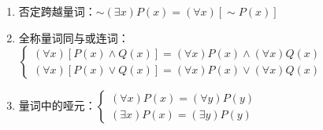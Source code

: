 \begin{solution}
\begin{enumerate}
		\item 否定跨越量词：$\sim (\exists x) P(x) = (\forall x)[\sim P(x)]$
		\item 全称量词同与或连词：$\begin{cases}
		(\forall x)[P(x) \wedge Q(x)] = (\forall x) P(x) \wedge (\forall x) Q(x) \\
		(\forall x)[P(x) \vee Q(x)] = (\forall x) P(x) \vee (\forall x) Q(x)
		\end{cases}$
		\item 量词中的哑元：$\begin{cases}
		(\forall x) P(x) = (\forall y) P(y) \\
		(\exists x) P(x) = (\exists y) P(y)
		\end{cases}$
	\end{enumerate}
\end{solution}

